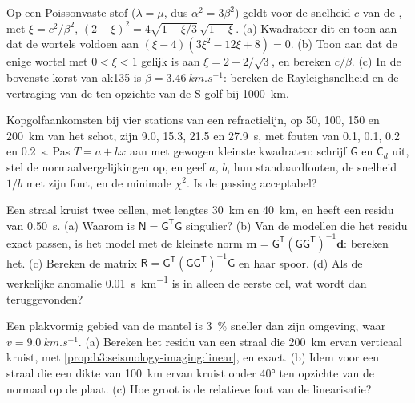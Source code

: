 \begin{exercise}[$\star\star$]\label{exo:b3:seismology-imaging:6}
Op een Poissonvaste stof ($\lambda = \mu$, dus $\alpha^2 = 3\beta^2$) geldt voor de
snelheid $c$ van de , met $\xi = c^2/\beta^2$,
$(2 - \xi)^2 = 4\sqrt{1 - \xi/3}\,\sqrt{1 - \xi}$. (a) Kwadrateer dit en toon
aan dat de wortels voldoen aan $(\xi - 4)(3\xi^2 - 12\xi + 8) = 0$. (b) Toon aan dat de
enige wortel met $0 < \xi < 1$ gelijk is aan $\xi = 2 - 2/\sqrt3$, en bereken $c/\beta$.
(c) In de bovenste korst van ak135 is $\beta = \qty{3.46}{km.s^{-1}}$: bereken de
Rayleighsnelheid en de vertraging van de  ten opzichte van de S-golf bij
\qty{1000}{km}.
\end{exercise}

\begin{exercise}[$\star\star$]\label{exo:b3:seismology-imaging:7}
Kopgolfaankomsten bij vier stations van een refractielijn, op 50, 100, 150 en
\qty{200}{km} van het schot, zijn 9.0, 15.3, 21.5 en \qty{27.9}{s}, met
fouten van 0.1, 0.1, 0.2 en \qty{0.2}{s}. Pas $T = a + bx$ aan met gewogen kleinste kwadraten:
schrijf $\mathsf G$ en $\mathsf C_d$ uit, stel de normaalvergelijkingen op, en
geef $a$, $b$, hun standaardfouten, de snelheid $1/b$ met zijn fout, en de
minimale $\chi^2$. Is de passing acceptabel?
\end{exercise}

\begin{exercise}[$\star\star$]\label{exo:b3:seismology-imaging:8}
Een straal kruist twee cellen, met lengtes \qty{30}{km} en \qty{40}{km}, en heeft
een residu van \qty{0.50}{s}. (a) Waarom is $\mathsf N = \mathsf G^{\mathsf T}
\mathsf G$ singulier? (b) Van de modellen die het residu exact passen, is het model
met de kleinste norm $\mathbf m = \mathsf G^{\mathsf T}(\mathsf G\mathsf
G^{\mathsf T})^{-1}\mathbf d$: bereken het. (c) Bereken de matrix
$\mathsf R = \mathsf G^{\mathsf T}(\mathsf G\mathsf G^{\mathsf T})^{-1}\mathsf G$
en haar spoor. (d) Als de werkelijke anomalie \qty{0.01}{s.km^{-1}} is in alleen
de eerste cel, wat wordt dan teruggevonden?
\end{exercise}

\begin{exercise}[$\star\star$]\label{exo:b3:seismology-imaging:9}
Een plakvormig gebied van de mantel is \qty{3}{\percent} sneller dan zijn omgeving,
waar $v = \qty{9.0}{km.s^{-1}}$. (a) Bereken het residu van een straal die
\qty{200}{km} ervan verticaal kruist, met \cref{prop:b3:seismology-imaging:linear},
en exact. (b) Idem voor een straal die een dikte van \qty{100}{km} ervan kruist
onder \ang{40} ten opzichte van de normaal op de plaat. (c) Hoe groot is de
relatieve fout van de linearisatie?
\end{exercise}

